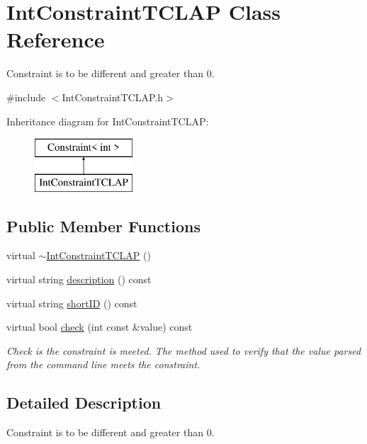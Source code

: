\hypertarget{class_int_constraint_t_c_l_a_p}{}\section{Int\+Constraint\+T\+C\+L\+AP Class Reference}
\label{class_int_constraint_t_c_l_a_p}


Constraint is to be different and greater than 0.  




{\ttfamily \#include $<$Int\+Constraint\+T\+C\+L\+A\+P.\+h$>$}

Inheritance diagram for Int\+Constraint\+T\+C\+L\+AP\+:\begin{figure}[H]
\begin{center}
\leavevmode
\includegraphics[height=2.000000cm]{class_int_constraint_t_c_l_a_p}
\end{center}
\end{figure}
\subsection*{Public Member Functions}
\begin{DoxyCompactItemize}
\item 
virtual \hyperlink{class_int_constraint_t_c_l_a_p_a5c6c58090c587d1904ab2483bba367e8}{$\sim$\+Int\+Constraint\+T\+C\+L\+AP} ()
\item 
virtual string \hyperlink{class_int_constraint_t_c_l_a_p_a44b1af8311beda265ca3fe8739d2fead}{description} () const
\item 
virtual string \hyperlink{class_int_constraint_t_c_l_a_p_af03964c4fd7094906df176a0b932a339}{short\+ID} () const
\item 
virtual bool \hyperlink{class_int_constraint_t_c_l_a_p_a30c4040229de8f3c7a20b2c9a7528af6}{check} (int const \&value) const
\begin{DoxyCompactList}\small\item\em Check is the constraint is meeted. The method used to verify that the value parsed from the command line meets the constraint. \end{DoxyCompactList}\end{DoxyCompactItemize}


\subsection{Detailed Description}
Constraint is to be different and greater than 0. 

